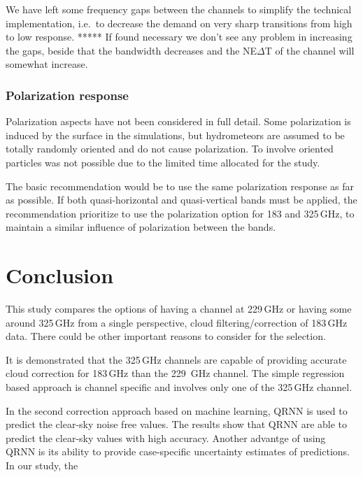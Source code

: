 \documentclass[12pt]{article}
\begin{document}
We have left some frequency gaps between the channels to simplify the technical
implementation, i.e.\ to decrease the demand on very sharp transitions from high
to low response. ***** If found necessary we don't see
any problem in increasing the gaps, beside that the bandwidth decreases and the
NE$\Delta$T of the channel will somewhat increase.


\subsubsection{Polarization response}
%
Polarization aspects have not been considered in full detail. Some polarization
is induced by the surface in the simulations, but hydrometeors are assumed to
be totally randomly oriented and do not cause polarization. To involve oriented
particles was not possible due to the limited time allocated for the study.

The basic recommendation would be to use the same polarization response as far
as possible. If both quasi-horizontal and quasi-vertical bands must be applied,
the recommendation prioritize to use the polarization option for 183 and
325\,GHz, to maintain a similar influence of polarization between the bands.


\section{Conclusion}
%
This study compares the options of having a channel at 229\,GHz or having some
around 325\,GHz from a single perspective, cloud filtering/correction of
183\,GHz data. There could be other important reasons to consider for the
selection.

It is demonstrated that the 325\,GHz channels are capable of providing accurate cloud correction for 183\,GHz than the 229 \,GHz channel. The simple regression based approach is channel specific and involves only one of the 325\,GHz channel.

In the second correction approach based on machine learning, QRNN is used to predict the clear-sky noise free values. The results show that QRNN are able to predict the clear-sky values with high accuracy. Another advantge of using QRNN is its ability to provide case-specific uncertainty estimates of predictions. In our study, the 


{\footnotesize

}
\end{document}
